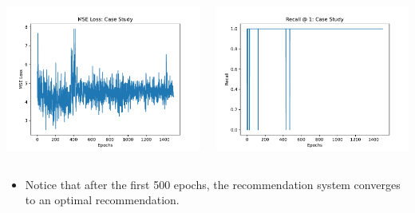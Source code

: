 \documentclass{beamer}
\begin{document}
\begin{frame}[fragile]
\begin{columns}
\begin{column}{0.55\textwidth}
    \begin{minipage}[c]{\linewidth}
        \includegraphics[width=\linewidth]{GNN/imgs/CaseStudyLoss.pdf}
    \end{minipage}
\end{column}
\begin{column}{0.55\textwidth}
    \begin{minipage}[c]{\linewidth}
        \includegraphics[width=\linewidth]{GNN/imgs/CaseStudyRecall.pdf}
    \end{minipage}
\end{column}
\end{columns}

\vspace{0.5cm}

\begin{itemize}
    \item Notice that after the first 500 epochs, the recommendation system converges to an optimal recommendation.
\end{itemize}

\end{frame}
\end{document}
